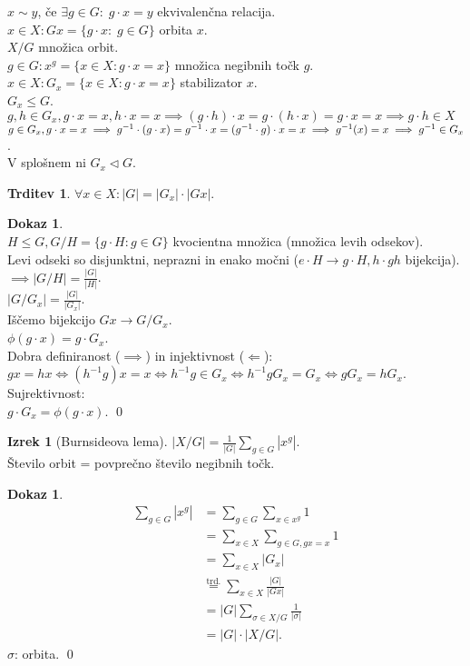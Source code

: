 \documentclass[a4paper, 12pt]{book}
\theoremstyle{definition}
\newtheorem{claim}[counter]{Trditev}
\newtheorem{theorem}[counter]{Izrek}
\newtheorem{pro}[counter]{Dokaz}
\theoremstyle{remark}
\begin{document}
$x \sim y$, če $\exists g \in G: \; g \cdot x = y$ ekvivalenčna relacija. \\
$x \in X: G x = \{g \cdot x: \; g \in G\}$ orbita $x$. \\
$X / G$ množica orbit. \\
$g \in G: x^g = \{x \in X: g \cdot x = x\}$ množica negibnih točk $g$. \\
$x \in X: G_x = \{x \in X: g \cdot x = x\}$ stabilizator $x$. \\
$G_x \leq G$. \\
$g, h \in G_x, g \cdot x = x, h \cdot x = x \implies (g \cdot h) \cdot x = g \cdot (h \cdot x) =
g \cdot x = x \implies g \cdot h \in X$ \\
$g \in G_x, g \cdot x = x \implies g^{-1} \cdot (g \cdot x) = g^{-1} \cdot x = (g^{-1} \cdot g) \cdot x = x \\
\implies g^{-1}(x) = x \implies g^{-1} \in G_x$. \\
V splošnem ni $G_x \triangleleft G$.
\begin{claim}
  $\forall x \in X: |G| = |G_x| \cdot |G x|$.
\end{claim}
\begin{pro} \text{} \\
  $H \leq G, G / H = \{g \cdot H: g \in G\}$ kvocientna množica (množica levih odsekov). \\
  Levi odseki so disjunktni, neprazni in enako močni ($e \cdot H \to g \cdot H, h \cdot g h$ bijekcija). \\
  $\implies |G / H| = \frac{|G|}{|H|}$. \\
  $|G / G_x| = \frac{|G|}{|G_x|}$. \\
  Iščemo bijekcijo $G x \to G / G_x$. \\
  $\phi(g \cdot x) = g \cdot G_x$. \\
  Dobra definiranost ($\implies$) in injektivnost ($\Longleftarrow$): \\
  $g x = h x \iff (h^{-1} g) x = x \iff h^{-1} g \in G_x \iff h^{-1} g G_x = G_x \iff g G_x = h G_x$. \\
  Sujrektivnost: \\
  $g \cdot G_x = \phi(g \cdot x)$.
  \qed
\end{pro}
\begin{theorem}[Burnsideova lema]
  $|X / G| = \frac{1}{|G|} \sum_{g \in G} \left|x^g\right|$. \\
  Število orbit = povprečno število negibnih točk.
\end{theorem}
\begin{pro}
  \begin{align*}
    \sum_{g \in G} \left|x^g\right| &= \sum_{g \in G} \sum_{x \in x^g} 1 \\
    &= \sum_{x \in X} \sum_{g \in G, gx = x} 1 \\
    &= \sum_{x \in X} |G_x| \\
    &\stackrel{\text{trd.}}{=} \sum_{x \in X} \frac{|G|}{|G x|} \\
    &= |G| \sum_{\sigma \in X / G} \frac{1}{|\sigma|} \\
    &= |G| \cdot |X / G|.
  \end{align*}
  $\sigma$: orbita.
  \qed
\end{pro}
\end{document}
